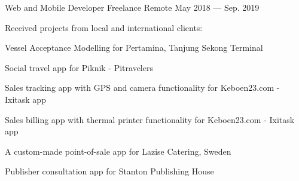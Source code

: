 \begin{cventries}
  \cventry
    {Web and Mobile Developer} %
    {Freelance} %
    {Remote} %
    {May 2018 --- Sep. 2019} %
    {
      \begin{cvitems} %
        \item {Received projects from local and international clients:}
        \item {Vessel Acceptance Modelling for Pertamina, Tanjung Sekong Terminal}
        \item {Social travel app for Piknik - Pitravelers}
        \item {Sales tracking app with GPS and camera functionality for Keboen23.com - Ixitask app}
        \item {Sales billing app with thermal printer functionality for Keboen23.com - Ixitask app}
        \item {A custom-made point-of-sale app for Lazise Catering, Sweden}
        \item {Publisher consultation app for Stanton Publishing House}
      \end{cvitems}
    }

\end{cventries}
